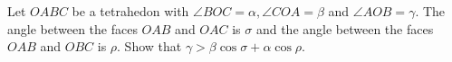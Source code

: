 Let $OABC$ be a tetrahedon with $\angle BOC=\alpha,\angle COA =\beta$ and $\angle AOB =\gamma$. The angle between the faces $OAB$ and $OAC$ is $\sigma$ and the angle between the faces $OAB$ and $OBC$ is $\rho$.
Show that $\gamma > \beta \cos\sigma + \alpha \cos\rho$.